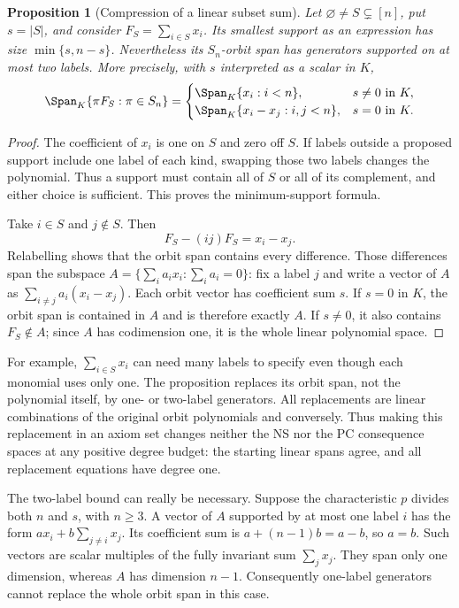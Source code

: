 \documentclass[11pt,a4paper,oneside,openany]{book}
\newtheorem{proposition}[theorem]{Proposition}
\theoremstyle{definition}\newtheorem{definition}[theorem]{Definition}
\theoremstyle{remark}\newtheorem{remark}[theorem]{Remark}
\numberwithin{equation}{chapter}
\begin{document}
\begin{proposition}[Compression of a linear subset sum]\label{tx:prop:linear-compression}
Let $\varnothing\ne S\subsetneq[n]$, put $s=|S|$, and consider
$F_S=\sum_{i\in S}x_i$. Its smallest support as an expression has size
$\min\{s,n-s\}$. Nevertheless its $S_n$-orbit span has generators
supported on at most two labels. More precisely, with $s$ interpreted
as a scalar in $K$,
\[
 \Span_K\{\pi F_S:\pi\in S_n\}=
 \begin{cases}
     \Span_K\{x_i:i<n\},&s\ne0\text{ in }K,\\
     \Span_K\{x_i-x_j:i,j<n\},&s=0\text{ in }K.
 \end{cases}
\]
\end{proposition}
\begin{proof}
The coefficient of $x_i$ is one on $S$ and zero off $S$. If labels
outside a proposed support include one label of each kind, swapping
those two labels changes the polynomial. Thus a support must contain
all of $S$ or all of its complement, and either choice is sufficient.
This proves the minimum-support formula.

Take $i\in S$ and $j\notin S$. Then
\[
                       F_S-(ij)F_S=x_i-x_j.
\]
Relabelling shows that the orbit span contains every difference.
Those differences span the subspace
$A=\{\sum_i a_ix_i:\sum_i a_i=0\}$: fix a label $j$ and write a
vector of $A$ as $\sum_{i\ne j}a_i(x_i-x_j)$.
Each orbit vector has coefficient sum $s$. If $s=0$ in $K$, the
orbit span is contained in $A$ and is therefore exactly $A$. If
$s\ne0$, it also contains $F_S\notin A$; since $A$ has codimension
one, it is the whole linear polynomial space.
\end{proof}

For example, $\sum_{i\in S}x_i$ can need many labels to specify even
though each monomial uses only one. The proposition replaces its orbit
span, not the polynomial itself, by one- or two-label generators.
All replacements are linear combinations of the original orbit
polynomials and conversely. Thus making this replacement in an axiom
set changes neither the NS nor the PC consequence spaces at any
positive degree budget: the starting linear spans agree, and all
replacement equations have degree one.

The two-label bound can really be necessary. Suppose the characteristic
$p$ divides both $n$ and $s$, with $n\ge3$. A vector of $A$ supported
by at most one label $i$ has the form
$a x_i+b\sum_{j\ne i}x_j$. Its coefficient sum is
$a+(n-1)b=a-b$, so $a=b$. Such vectors are scalar multiples of the
fully invariant sum $\sum_jx_j$. They span only one dimension, whereas
$A$ has dimension $n-1$. Consequently one-label generators cannot
replace the whole orbit span in this case.
\end{document}
